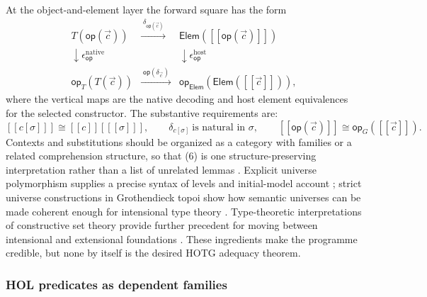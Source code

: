 \documentclass[11pt]{article}
\theoremstyle{definition}
\theoremstyle{remark}
\newcommand{\sem}[1]{[\![#1]\!]}
\begin{document}
At the object-and-element layer the forward square has the form
\[
\begin{array}{ccc}
  T(\mathsf{op}(\vec c))
    & \xrightarrow{\;\delta_{\mathsf{op}(\vec c)}\;} &
    \mathsf{Elem}(\sem{\mathsf{op}(\vec c)})\\
  \downarrow \epsilon^{\mathrm{native}}_{\mathsf{op}} &&
    \downarrow \epsilon^{\mathrm{host}}_{\mathsf{op}}\\
  \mathsf{op}_{T}(T(\vec c))
    & \xrightarrow{\;\mathsf{op}(\delta_{\vec c})\;} &
    \mathsf{op}_{\mathsf{Elem}}(\mathsf{Elem}(\sem{\vec c})),
\end{array}
\]
where the vertical maps are the native decoding and host element equivalences
for the selected constructor.  The
substantive requirements are:
\[
  \sem{c[\sigma]}\cong\sem c[\sem\sigma],
  \qquad
  \delta_{c[\sigma]}\ \text{is natural in }\sigma,
  \qquad
  \sem{\mathsf{op}(\vec c)}\cong
    \mathsf{op}_{G}(\sem{\vec c}).                       \tag{6}
\]
Contexts and substitutions should be organized as a category with families or
a related comprehension structure, so that (6) is one structure-preserving
interpretation rather than a list of unrelated lemmas
\cite{DybjerInternalTypeTheory}.  Explicit universe polymorphism supplies a
precise syntax of levels and initial-model account
\cite{BezemUniversePolymorphism,BezemGATUniversePolymorphism}; strict universe
constructions in Grothendieck topoi show how semantic universes can be made
coherent enough for intensional type theory
\cite{GratzerStrictUniverses}.  Type-theoretic interpretations of constructive
set theory provide further precedent for moving between intensional and
extensional foundations \cite{AczelTypeTheorySetTheory,GambinoAczelCZF}.
These ingredients make the programme credible, but none by itself is the desired
HOTG adequacy theorem.

\subsubsection{HOL predicates as dependent families}
\end{document}
